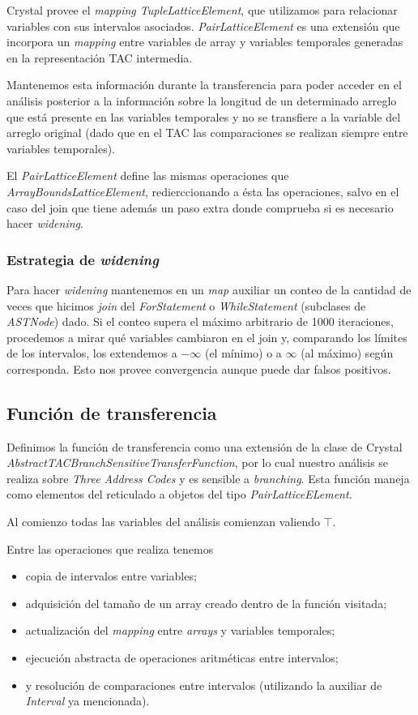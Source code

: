 \documentclass[a4paper]{article}
\begin{document}
Crystal provee el \emph{mapping TupleLatticeElement}, que utilizamos para relacionar variables con sus intervalos asociados. \emph{PairLatticeElement} es una extensión que incorpora un \emph{mapping} entre variables de array y variables temporales generadas en la representación TAC intermedia. 

Mantenemos esta información durante la transferencia para poder acceder en el análisis posterior a la información sobre la longitud de un determinado arreglo que está presente en las variables temporales y no se transfiere a la variable del arreglo original (dado que en el TAC las comparaciones se realizan siempre entre variables temporales).

El \emph{PairLatticeElement} define las mismas operaciones que \emph{ArrayBoundsLatticeElement}, redierccionando a ésta las operaciones, salvo en el caso del join que tiene además un paso extra donde comprueba si es necesario hacer \emph{widening}. 

\subsubsection{Estrategia de \emph{widening}}

Para hacer \emph{widening} mantenemos en un \emph{map} auxiliar un conteo de la cantidad de veces que hicimos \emph{join} del \emph{ForStatement} o \emph{WhileStatement} (subclases de \emph{ASTNode}) dado. Si el conteo supera el máximo arbitrario de 1000 iteraciones, procedemos a mirar qué variables cambiaron en el join y, comparando los límites de los intervalos, los extendemos a $-\infty$ (el mínimo) o a $\infty$ (al máximo) según corresponda. Esto nos provee convergencia aunque puede dar falsos positivos.

\subsection{Función de transferencia}

Definimos la función de transferencia como una extensión de la clase de Crystal \emph{AbstractTACBranchSensitiveTransferFunction}, por lo cual nuestro análisis se realiza sobre \emph{Three Address Codes} y es sensible a \emph{branching}. Esta función maneja como elementos del reticulado a objetos del tipo \emph{PairLatticeELement}.

Al comienzo todas las variables del análisis comienzan valiendo $\top$.

Entre las operaciones que realiza tenemos
\begin{itemize}
\item copia de intervalos entre variables;
\item adquisición del tamaño de un array creado dentro de la función visitada;
\item actualización del \emph{mapping} entre \emph{arrays} y variables temporales;
\item ejecución abstracta de operaciones aritméticas entre intervalos;
\item y resolución de comparaciones entre intervalos (utilizando la auxiliar de \emph{Interval} ya mencionada).
\end{itemize}
\end{document}
